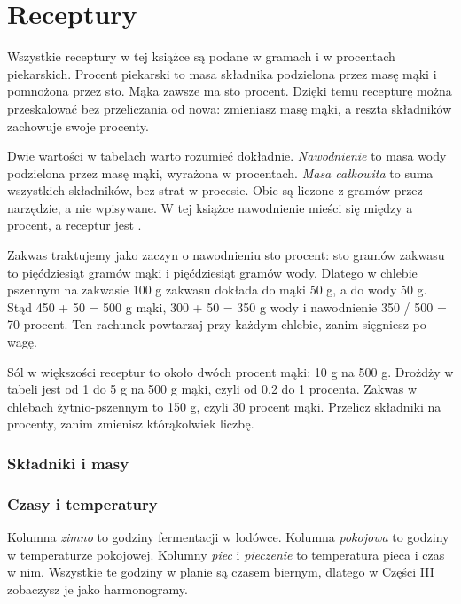 \chapter{Receptury}

Wszystkie receptury w tej książce są podane w gramach i w procentach piekarskich. Procent piekarski to masa składnika podzielona przez masę mąki i pomnożona przez sto. Mąka zawsze ma sto procent. Dzięki temu recepturę można przeskalować bez przeliczania od nowa: zmieniasz masę mąki, a reszta składników zachowuje swoje procenty.

Dwie wartości w tabelach warto rozumieć dokładnie. \emph{Nawodnienie} to masa wody podzielona przez masę mąki, wyrażona w procentach. \emph{Masa całkowita} to suma wszystkich składników, bez strat w procesie. Obie są liczone z gramów przez narzędzie, a nie wpisywane. W tej książce nawodnienie mieści się między  a  procent, a receptur jest .

Zakwas traktujemy jako zaczyn o nawodnieniu sto procent: sto gramów zakwasu to pięćdziesiąt gramów mąki i pięćdziesiąt gramów wody. Dlatego w chlebie pszennym na zakwasie 100 g zakwasu dokłada do mąki 50 g, a do wody 50 g. Stąd 450 + 50 = 500 g mąki, 300 + 50 = 350 g wody i nawodnienie 350 / 500 = 70 procent. Ten rachunek powtarzaj przy każdym chlebie, zanim sięgniesz po wagę.

Sól w większości receptur to około dwóch procent mąki: 10 g na 500 g. Drożdży w tabeli jest od 1 do 5 g na 500 g mąki, czyli od 0,2 do 1 procenta. Zakwas w chlebach żytnio-pszennym to 150 g, czyli 30 procent mąki. Przelicz składniki na procenty, zanim zmienisz którąkolwiek liczbę.

\subsection*{Składniki i masy}


\subsection*{Czasy i temperatury}


Kolumna \emph{zimno} to godziny fermentacji w lodówce. Kolumna \emph{pokojowa} to godziny w temperaturze pokojowej. Kolumny \emph{piec} i \emph{pieczenie} to temperatura pieca i czas w nim. Wszystkie te godziny w planie są czasem biernym, dlatego w Części III zobaczysz je jako harmonogramy.

